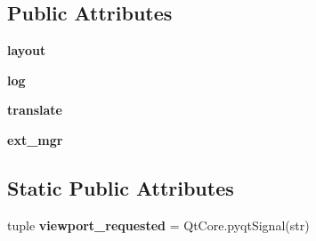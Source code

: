 \subsection*{Public Attributes}
\begin{DoxyCompactItemize}
\item 
\hypertarget{classcommotion__client_1_1GUI_1_1menu__bar_1_1MenuBar_a43b84a445a05f441662320e5f26b5599}{{\bfseries layout}}\label{classcommotion__client_1_1GUI_1_1menu__bar_1_1MenuBar_a43b84a445a05f441662320e5f26b5599}

\item 
\hypertarget{classcommotion__client_1_1GUI_1_1menu__bar_1_1MenuBar_a2397d4b257aa499bf1ef5da6e5b5faea}{{\bfseries log}}\label{classcommotion__client_1_1GUI_1_1menu__bar_1_1MenuBar_a2397d4b257aa499bf1ef5da6e5b5faea}

\item 
\hypertarget{classcommotion__client_1_1GUI_1_1menu__bar_1_1MenuBar_ad97dbe989a68d0453584c7c95137b8b4}{{\bfseries translate}}\label{classcommotion__client_1_1GUI_1_1menu__bar_1_1MenuBar_ad97dbe989a68d0453584c7c95137b8b4}

\item 
\hypertarget{classcommotion__client_1_1GUI_1_1menu__bar_1_1MenuBar_a967f47cfbc1348e41bc11026fb9ff0ac}{{\bfseries ext\+\_\+mgr}}\label{classcommotion__client_1_1GUI_1_1menu__bar_1_1MenuBar_a967f47cfbc1348e41bc11026fb9ff0ac}

\end{DoxyCompactItemize}
\subsection*{Static Public Attributes}
\begin{DoxyCompactItemize}
\item 
\hypertarget{classcommotion__client_1_1GUI_1_1menu__bar_1_1MenuBar_a10d4ce58617e1125c7f7e43512bc960a}{tuple {\bfseries viewport\+\_\+requested} = Qt\+Core.\+pyqt\+Signal(str)}\label{classcommotion__client_1_1GUI_1_1menu__bar_1_1MenuBar_a10d4ce58617e1125c7f7e43512bc960a}

\end{DoxyCompactItemize}


